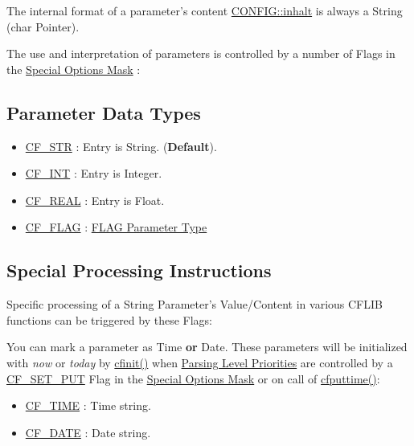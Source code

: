 The internal format of a parameter's content \hyperlink{struct_c_o_n_f_i_g_b8cae13203b07fabaa40e407fa8dbdfb}{CONFIG::inhalt} is always a String (char Pointer).

The use and interpretation of parameters is controlled by a number of Flags in the \hyperlink{group__special__options__mask}{Special Options Mask} :\hypertarget{parameter_types_parameter_datatypes}{}\subsection{Parameter Data Types}\label{parameter_types_parameter_datatypes}
\begin{itemize}
\item \hyperlink{group__special__options__mask_g64c30a2865061d0c1074bc6ec91e3dcf}{CF\_\-STR} : Entry is String.  ({\bf Default}).\item \hyperlink{group__special__options__mask_gb33869d596619ad14675c053925a42e0}{CF\_\-INT} : Entry is Integer. \item \hyperlink{group__special__options__mask_geefdbef320cbd7179f1fb0ebe0fcf5ce}{CF\_\-REAL} : Entry is Float. \item \hyperlink{group__special__options__mask_g1d1f1d1b6eac6b5d9970102318ab2667}{CF\_\-FLAG} : \hyperlink{parameter_types_parameter_type_flag}{FLAG Parameter Type}\end{itemize}
\hypertarget{parameter_types_processing_instructions}{}\subsection{Special Processing Instructions}\label{parameter_types_processing_instructions}
Specific processing of a String Parameter's Value/Content in various CFLIB functions can be triggered by these Flags:

You can mark a parameter as Time {\bf or} Date. These parameters will be initialized with {\em now\/} or {\em today\/} by \hyperlink{group__cflib__core_ge593ff607f853bd5fc16a16bb6759314}{cfinit()} when \hyperlink{config_levels_parsing_level_priorities}{Parsing Level Priorities} are controlled by a \hyperlink{group__special__options__mask_g8d6cd1608fef5638efe964da63edf2dd}{CF\_\-SET\_\-PUT} Flag in the \hyperlink{group__special__options__mask}{Special Options Mask} or on call of \hyperlink{group__setting__saving_g6f133f88dc253a6a80d13eed4d123063}{cfputtime()}:

\begin{itemize}
\item \hyperlink{group__special__options__mask_g0fde537a92deb77f75b21c9e8d306509}{CF\_\-TIME} : Time string. \item \hyperlink{group__special__options__mask_g1c5b511a34d2c0db6631539ba81a4386}{CF\_\-DATE} : Date string. \end{itemize}


